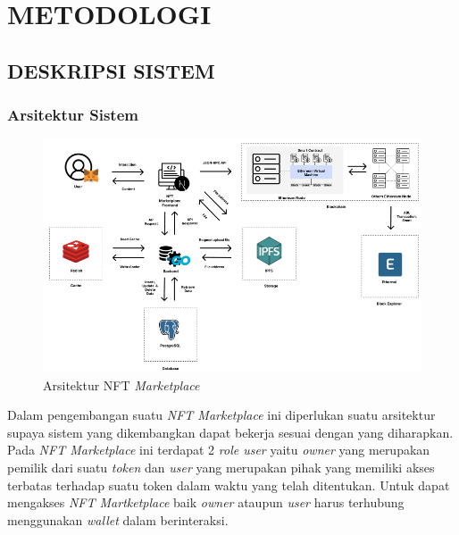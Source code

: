 \chapter{METODOLOGI}

\section{DESKRIPSI SISTEM}

\subsection{Arsitektur Sistem}

\begin{figure} [ht] \centering
  \includegraphics[scale=0.45]{gambar/img-architecture.png}
  \caption{Arsitektur NFT \emph{Marketplace}}
  \label{fig:Architecture}
\end{figure}

Dalam pengembangan suatu \emph{NFT Marketplace} ini diperlukan suatu arsitektur supaya sistem yang dikembangkan dapat bekerja sesuai dengan yang diharapkan. Pada \emph{NFT Marketplace} ini terdapat 2 \emph{role user} yaitu \emph{owner} yang merupakan pemilik dari suatu \emph{token} dan \emph{user} yang merupakan pihak yang memiliki akses terbatas terhadap suatu token dalam waktu yang telah ditentukan. Untuk dapat mengakses \emph{NFT Martketplace} baik \emph{owner} ataupun \emph{user} harus terhubung menggunakan \emph{wallet} dalam berinteraksi. 

